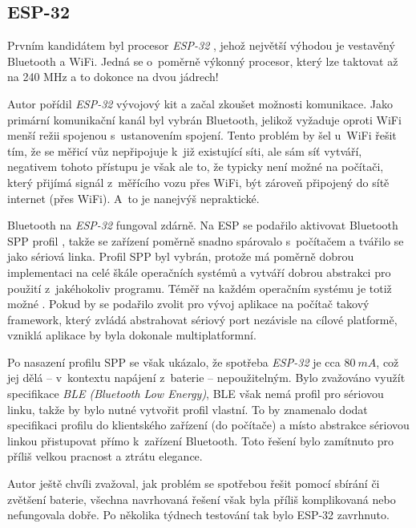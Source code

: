 \subsection{ESP-32}
\label{subsec:wsm-esp32}

Prvním kandidátem byl procesor \textit{ESP-32} \cite{esp-32}, jehož největší
výhodou je vestavěný Bluetooth a WiFi. Jedná se o~poměrně výkonný procesor,
který lze taktovat až na 240 MHz a to dokonce na dvou jádrech!
\cite{esp-32:datasheet}

Autor pořídil \textit{ESP-32} vývojový kit a začal zkoušet možnosti komunikace. Jako
primární komunikační kanál byl vybrán Bluetooth, jelikož vyžaduje oproti WiFi
menší režii spojenou s~ustanovením spojení. Tento problém by šel u~WiFi řešit
tím, že se měřicí vůz nepřipojuje k~již existující síti, ale sám síť vytváří,
negativem tohoto přístupu je však ale to, že typicky není možné na počítači,
který přijímá signál z~měřícího vozu přes WiFi, být zároveň připojený do sítě
internet (přes WiFi). A~to je nanejvýš nepraktické.

Bluetooth na \textit{ESP-32} fungoval zdárně. Na ESP se podařilo aktivovat Bluetooth SPP
profil \cite{spp:specs}, takže se zařízení poměrně snadno spárovalo s~počítačem a
tvářilo se jako sériová linka. Profil SPP byl vybrán, protože má
poměrně dobrou implementaci na celé škále operačních systémů a vytváří dobrou
abstrakci pro použití z~jakéhokoliv programu. Téměř na každém operačním systému
je totiž možné . Pokud by se podařilo zvolit pro
vývoj aplikace na počítač takový framework, který zvládá abstrahovat sériový
port nezávisle na cílové platformě, vzniklá aplikace by byla dokonale
multiplatformní.

Po nasazení profilu SPP se však ukázalo, že spotřeba \textit{ESP-32} je cca $80\ mA$,
což jej dělá -- v~kontextu napájení z~baterie -- nepoužitelným. Bylo zvažováno
využít specifikace \textit{BLE (Bluetooth Low Energy)}, BLE však nemá
profil pro sériovou linku, takže by bylo nutné vytvořit profil vlastní. To
by znamenalo dodat specifikaci profilu do klientského zařízení (do počítače)
a místo abstrakce sériovou linkou přistupovat přímo k~zařízení Bluetooth.
Toto řešení bylo zamítnuto pro příliš velkou pracnost a ztrátu elegance.

Autor ještě chvíli zvažoval, jak problém se spotřebou řešit pomocí sbírání či
zvětšení baterie, všechna navrhovaná řešení však byla příliš komplikovaná nebo
nefungovala dobře. Po několika týdnech testování tak bylo ESP-32 zavrhnuto.


